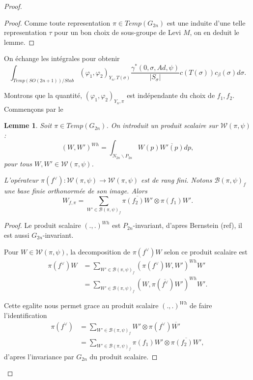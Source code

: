 \documentclass{amsart}
\newtheorem{lemme}{Lemme}[section]
\begin{document}
\begin{proof}
\begin{proof}
Comme toute representation $\pi \in Temp(G_{2n})$ est une induite d'une telle representation $\tau$ pour un bon choix de sous-groupe de Levi $M$, on en deduit le lemme.
\end{proof}

On échange les intégrales pour obtenir
\begin{equation}
\int_{Temp(SO(2n+1))/Stab} (\varphi_1, \varphi_2)_{Y_n, T(\sigma)} \frac{\gamma^*(0, \sigma, Ad, \psi)}{|S_\sigma|} c(T(\sigma))c_\beta(\sigma)d\sigma.
\end{equation}

Montrons que la quantité, $(\varphi_1, \varphi_2)_{Y_n, \pi}$ est indépendante du choix de $f_1, f_2$. Commençons par le
\begin{lemme}
\label{decbase}
Soit $\pi \in Temp(G_{2n})$. On introduit un produit scalaire sur $\mathcal{W}(\pi, \psi)$ :
\begin{equation}
(W, W')^{Wh} = \int_{N_{2n} \backslash P_{2n}} W(p)\overline{W'(p)} dp,
\end{equation}
pour tous $W, W' \in \mathcal{W}(\pi, \psi)$.

L'opérateur $\pi(f^{\vee}) : \mathcal{W}(\pi, \psi) \rightarrow \mathcal{W}(\pi, \psi)$ est de rang fini. Notons $\mathcal{B}(\pi, \psi)_f$ une base finie orthonormée de son image. Alors
\begin{equation}
W_{f,\pi} = \sum_{W' \in \mathcal{B}(\pi, \psi)_f} \overline{\pi(f_2)W'} \otimes \pi(f_1)W'.
\end{equation}
\end{lemme}

\begin{proof}
Le produit scalaire $(.,.)^{Wh}$ est $P_{2n}$-invariant, d'apres Bernstein (ref), il est aussi $G_{2n}$-invariant.

Pour $W \in \mathcal{W}(\pi, \psi)$, la decomposition de $\pi(f^{\vee})W$ selon ce produit scalaire est
\begin{equation}
\begin{split}
\pi(f^{\vee})W &= \sum_{W' \in \mathcal{B}(\pi, \psi)_f} (\pi(f^{\vee})W, W')^{Wh}W' \\
&= \sum_{W' \in \mathcal{B}(\pi, \psi)_f} (W, \pi(\overline{f^{\vee}})W')^{Wh}W'.
\end{split}
\end{equation}

Cette egalite nous permet grace au produit scalaire $(.,.)^{Wh}$ de faire l'identification
\begin{equation}
\begin{split}
\pi(f^\vee) &= \sum_{W' \in \mathcal{B}(\pi, \psi)_f} W' \otimes \pi(f^\vee)\overline{W'} \\
&= \sum_{W' \in \mathcal{B}(\pi, \psi)_f} \pi(f_1)W' \otimes \overline{\pi(f_2)W'},
\end{split}
\end{equation}
d'apres l'invariance par $G_{2n}$ du produit scalaire.


\end{proof}
\end{proof}
\end{document}
